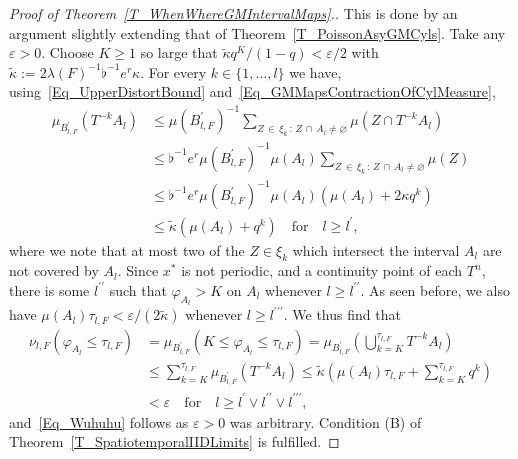 \documentclass[10pt]{amsart}
\theoremstyle{definition}\newtheorem{defi}[theo]{Definition}\newtheorem{rema}[theo]{Remark}\newtheorem{exam}[theo]{Example}\newtheorem{exem}[theo]{Example}\newtheorem{nota}[theo]{Notation}
\begin{document}
\begin{proof}[{Proof of Theorem~\ref{T_WhenWhereGMIntervalMaps}.}]
This is done by an argument slightly extending that of Theorem~\ref{T_PoissonAsyGMCyls}. Take any $\varepsilon>0$. Choose $K\geq1$ so large that $\widetilde{\kappa}q^{K}/(1-q)<\varepsilon/2$ with $\widetilde{\kappa }:=2\lambda(F)^{-1}\flat^{-1}e^{r}\kappa$. For every $k\in\{1,\ldots,l\} $ we have, using~\eqref{Eq_UpperDistortBound} and~\eqref{Eq_GMMapsContractionOfCylMeasure},
\begin{equation}
\begin{split}
\mu_{B_{l,F}^{\prime}}\left(T^{-k}A_{l}\right) & \leq\mu\left(B_{l,F}^{\prime}\right)^{-1} {\textstyle\sum\nolimits_{Z\,\in\,\xi_{k}\,:\,Z\,\cap\,A_{l}\neq\varnothing}}
\mu\left(Z\cap T^{-k}A_{l}\right)\\
& \leq\flat^{-1}e^{r}\mu\left(B_{l,F}^{\prime}\right)^{-1}\mu(A_{l}) {\textstyle\sum\nolimits_{Z\,\in\,\xi_{k}\,:\,Z\,\cap \,A_{l}\neq\varnothing}}
\mu(Z)\\
& \leq\flat^{-1}e^{r}\mu\left(B_{l,F}^{\prime}\right)^{-1}\mu(A_{l})\left(\mu(A_{l})+2\kappa q^{k}\right)\\
& \leq\widetilde{\kappa}\left(\mu(A_{l})+q^{k}\right)\quad \text{for}\quad l\geq l^{\prime },
\end{split}
\end{equation}
where we note that at most two of the $Z\in\xi_{k}$ which intersect the interval $A_{l}$ are not covered by $A_{l}$. Since $x^{\ast}$ is not periodic, and a continuity point of each $T^{n}$, there is some $l^{\prime\prime}$ such that $\varphi_{A_{l}}>K$ on $A_{l}$ whenever $l\geq l^{\prime\prime}$. As seen before, we also have $\mu(A_{l})\tau_{l,F}<\varepsilon/(2\widetilde{\kappa})$ whenever $l\geq l^{\prime\prime\prime}$. We thus find that
\begin{equation}
\begin{split}
\nu_{l,F}\left(\varphi_{A_{l}}\leq\tau_{l,F}\right) & =\mu_{B_{l,F} ^{\prime}}\left(K\leq\varphi_{A_{l}}\leq\tau_{l,F}\right) =\mu _{B_{l,F}^{\prime}}\left({\textstyle\bigcup\nolimits_{k=K}^{\tau_{l,F}}} T^{-k}A_{l}\right)\\
& \leq {\textstyle\sum\nolimits_{k=K}^{\tau_{l,F}}}
\mu_{B_{l,F}^{\prime}}\left(T^{-k}A_{l}\right) \leq\widetilde{\kappa }\left(\mu(A_{l})\tau_{l,F}+ {\textstyle\sum\nolimits_{k=K}^{\tau_{l,F}}} q^{k}\right) \\
& <\varepsilon \quad \text{for} \quad  l\geq l^{\prime}\vee l^{\prime\prime}\vee l^{\prime\prime\prime},
\end{split}
\end{equation}
and~\eqref{Eq_Wuhuhu} follows as $\varepsilon>0$ was arbitrary. Condition (B) of Theorem~\ref{T_SpatiotemporalIIDLimits} is fulfilled.
 

\end{proof}
\end{document}
